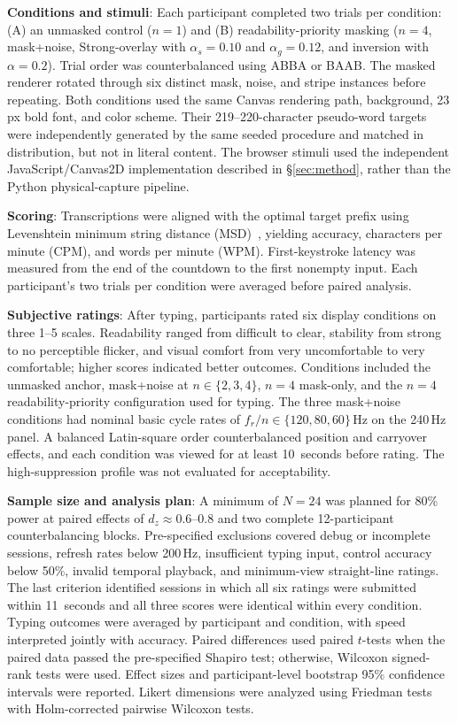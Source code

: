\documentclass{ieeeaccess}
\begin{document}
\textbf{Conditions and stimuli}: Each participant completed two trials per condition: (A) an unmasked control ($n=1$) and (B) readability-priority masking ($n=4$, mask+noise, Strong-overlay with $\alpha_s=0.10$ and $\alpha_g=0.12$, and inversion with $\alpha=0.2$). Trial order was counterbalanced using ABBA or BAAB. The masked renderer rotated through six distinct mask, noise, and stripe instances before repeating. Both conditions used the same Canvas rendering path, background, 23\,px bold font, and color scheme. Their 219--220-character pseudo-word targets were independently generated by the same seeded procedure and matched in distribution, but not in literal content. The browser stimuli used the independent JavaScript/Canvas2D implementation described in \S\ref{sec:method}, rather than the Python physical-capture pipeline.

\textbf{Scoring}: Transcriptions were aligned with the optimal target prefix using Levenshtein minimum string distance (MSD)~\cite{b_soukoreff2003}, yielding accuracy, characters per minute (CPM), and words per minute (WPM). First-keystroke latency was measured from the end of the countdown to the first nonempty input. Each participant's two trials per condition were averaged before paired analysis.

\textbf{Subjective ratings}: After typing, participants rated six display conditions on three 1--5 scales. Readability ranged from difficult to clear, stability from strong to no perceptible flicker, and visual comfort from very uncomfortable to very comfortable; higher scores indicated better outcomes. Conditions included the unmasked anchor, mask+noise at $n\in\{2,3,4\}$, $n=4$ mask-only, and the $n=4$ readability-priority configuration used for typing. The three mask+noise conditions had nominal basic cycle rates of $f_r/n\in\{120, 80, 60\}$\,Hz on the 240\,Hz panel. A balanced Latin-square order counterbalanced position and carryover effects, and each condition was viewed for at least 10~seconds before rating. The high-suppression profile was not evaluated for acceptability.

\textbf{Sample size and analysis plan}: A minimum of $N=24$ was planned for 80\% power at paired effects of $d_z\approx0.6$--$0.8$ and two complete 12-participant counterbalancing blocks. Pre-specified exclusions covered debug or incomplete sessions, refresh rates below 200\,Hz, insufficient typing input, control accuracy below 50\%, invalid temporal playback, and minimum-view straight-line ratings. The last criterion identified sessions in which all six ratings were submitted within 11~seconds and all three scores were identical within every condition. Typing outcomes were averaged by participant and condition, with speed interpreted jointly with accuracy. Paired differences used paired $t$-tests when the paired data passed the pre-specified Shapiro test; otherwise, Wilcoxon signed-rank tests were used. Effect sizes and participant-level bootstrap 95\% confidence intervals were reported. Likert dimensions were analyzed using Friedman tests with Holm-corrected pairwise Wilcoxon tests.
\end{document}

